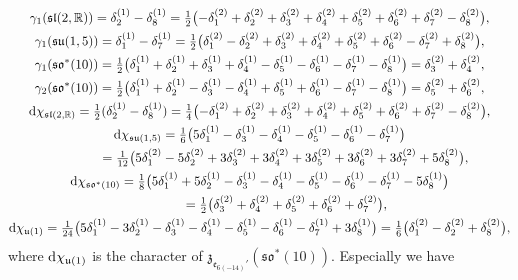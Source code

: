 \documentclass[pdftex]{sigma}
\numberwithin{equation}{section}
\newcommand{\BR}{\mathbb{R}}
\newcommand{\fz}{\mathfrak{z}}
\begin{document}
\begin{gather*}
\gamma_1(\mathfrak{sl}(2,\BR)) =\delta_2^{(1)}-\delta_8^{(1)}
=\tfrac{1}{2}\big({-}\delta_1^{(2)}+\delta_2^{(2)}+\delta_3^{(2)}+\delta_4^{(2)}+\delta_5^{(2)}+\delta_6^{(2)}+\delta_7^{(2)}-\delta_8^{(2)}\big),\\
\gamma_1(\mathfrak{su}(1,5)) =\delta_1^{(1)}-\delta_7^{(1)}
=\tfrac{1}{2}\big(\delta_1^{(2)}-\delta_2^{(2)}+\delta_3^{(2)}+\delta_4^{(2)}+\delta_5^{(2)}+\delta_6^{(2)}-\delta_7^{(2)}+\delta_8^{(2)}\big),\\
\gamma_1(\mathfrak{so}^*(10))
 =\tfrac{1}{2}\big(\delta_1^{(1)}+\delta_2^{(1)}+\delta_3^{(1)}+\delta_4^{(1)}-\delta_5^{(1)}-\delta_6^{(1)}-\delta_7^{(1)}-\delta_8^{(1)}\big)
=\delta_3^{(2)}+\delta_4^{(2)},\\
\gamma_2(\mathfrak{so}^*(10))
 =\tfrac{1}{2}\big(\delta_1^{(1)}+\delta_2^{(1)}-\delta_3^{(1)}-\delta_4^{(1)}+\delta_5^{(1)}+\delta_6^{(1)}-\delta_7^{(1)}-\delta_8^{(1)}\big)
=\delta_5^{(2)}+\delta_6^{(2)},\\
{\rm d}\chi_{\mathfrak{sl}(2,\BR)} =\tfrac{1}{2}(\delta_2^{(1)}-\delta_8^{(1)})
=\tfrac{1}{4}\big({-}\delta_1^{(2)}+\delta_2^{(2)}+\delta_3^{(2)}+\delta_4^{(2)}+\delta_5^{(2)}+\delta_6^{(2)}+\delta_7^{(2)}-\delta_8^{(2)}\big),\\
{\rm d}\chi_{\mathfrak{su}(1,5)} =\tfrac{1}{6}\big(5\delta_1^{(1)}-\delta_3^{(1)}-\delta_4^{(1)}-\delta_5^{(1)}-\delta_6^{(1)}-\delta_7^{(1)}\big)\\
\hphantom{{\rm d}\chi_{\mathfrak{su}(1,5)}}{} =\tfrac{1}{12}\big(5\delta_1^{(2)}-5\delta_2^{(2)}+3\delta_3^{(2)}+3\delta_4^{(2)}+3\delta_5^{(2)}+3\delta_6^{(2)}+3\delta_7^{(2)}+5\delta_8^{(2)}\big),\\
{\rm d}\chi_{\mathfrak{so}^*(10)}
 =\tfrac{1}{8}\big(5\delta_1^{(1)}+5\delta_2^{(1)}-\delta_3^{(1)}-\delta_4^{(1)}-\delta_5^{(1)}-\delta_6^{(1)}-\delta_7^{(1)}-5\delta_8^{(1)}\big)\\
\hphantom{{\rm d}\chi_{\mathfrak{so}^*(10)}}{} =\tfrac{1}{2}\big(\delta_3^{(2)}+\delta_4^{(2)}+\delta_5^{(2)}+\delta_6^{(2)}+\delta_7^{(2)}\big),\\
{\rm d}\chi_{\mathfrak{u}(1)}
 =\tfrac{1}{24}\big(5\delta_1^{(1)}-3\delta_2^{(1)}-\delta_3^{(1)}-\delta_4^{(1)}-\delta_5^{(1)}-\delta_6^{(1)}-\delta_7^{(1)}+3\delta_8^{(1)}\big)
 =\tfrac{1}{6}\big(\delta_1^{(2)}-\delta_2^{(2)}+\delta_8^{(2)}\big),
\end{gather*}
where ${\rm d}\chi_{\mathfrak{u}(1)}$ is the character of $\fz_{\mathfrak{e}_{6(-14)}'}(\mathfrak{so}^*(10))$. Especially we have
\end{document}
